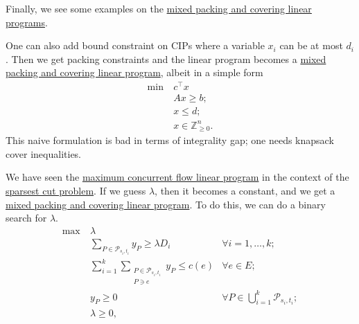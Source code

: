 Finally, we see some examples on the \hyperref[def:mixed-packing-covering-LP]{mixed packing and covering linear programs}.

\begin{eg}
	One can also add bound constraint on CIPs where a variable \(x_i\) can be at most \(d_i\). Then we get packing constraints and the linear program becomes a \hyperref[def:mixed-packing-covering-LP]{mixed packing and covering linear program}, albeit in a simple form
	\[
		\begin{aligned}
			\min~ & c^{\top} x                    \\
			      & Ax \geq b ;                   \\
			      & x \leq d ;                    \\
			      & x \in \mathbb{Z} _{\geq 0}^n.
		\end{aligned}
	\]
	This naive formulation is bad in terms of integrality gap; one needs knapsack cover inequalities.
\end{eg}

\begin{eg}
	We have seen the \hyperref[eq:non-uniform-sparsest-cut-LP-dual]{maximum concurrent flow linear program} in the context of the \hyperref[prb:non-uniform-sparsest-cut]{sparsest cut problem}. If we guess \(\lambda \), then it becomes a constant, and we get a \hyperref[def:mixed-packing-covering-LP]{mixed packing and covering linear program}. To do this, we can do a binary search for \(\lambda \).
	\[
		\begin{aligned}
			\max~ & \lambda                                                                                                                 \\
			      & \sum_{P \in \mathcal{P} _{s_i, t_i}} y_P \geq \lambda D_i    & \forall i = 1, \dots , k;                                \\
			      & \sum_{i=1}^{k} \sum_{\substack{P \in \mathcal{P} _{s_i, t_i}                                                            \\ P \ni e}} y_P \leq c(e) & \forall e \in E;                                         \\
			      & y_P \geq 0                                                   & \forall P \in \bigcup_{i=1}^{k} \mathcal{P} _{s_i, t_i}; \\
			      & \lambda \geq 0,
		\end{aligned}
	\]
\end{eg}

